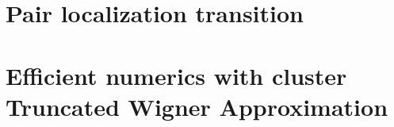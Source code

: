 \chapter{Pair localization transition}




\chapter{Efficient numerics with cluster Truncated Wigner Approximation}